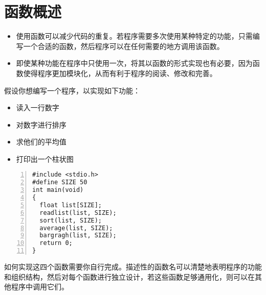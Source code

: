 \section{函数概述}

\begin{frame}
\begin{itemize}
\item 使用函数可以减少代码的重复。若程序需要多次使用某种特定的功能，只需编写一个合适的函数，然后程序可以在任何需要的地方调用该函数。\\[0.2in]
\item 即使某种功能在程序中只使用一次，将其以函数的形式实现也有必要，因为函数使得程序更加模块化，从而有利于程序的阅读、修改和完善。
\end{itemize}
\end{frame}

\begin{frame}
假设你想编写一个程序，以实现如下功能：\vspace{0.1in}

\begin{itemize}
\item  读入一行数字 \\[0.1in]
\item  对数字进行排序 \\[0.1in]
\item  求他们的平均值 \\[0.1in]
\item  打印出一个柱状图
\end{itemize}
\end{frame}

\begin{frame}[fragile]
\begin{lstlisting}[numbers=left]
#include <stdio.h>
#define SIZE 50
int main(void)
{
  float list[SIZE];  
  readlist(list, SIZE);
  sort(list, SIZE);
  average(list, SIZE);
  bargragh(list, SIZE);  
  return 0;
}
\end{lstlisting}
\end{frame}

\begin{frame}[fragile]
如何实现这四个函数需要你自行完成。描述性的函数名可以清楚地表明程序的功能和组织结构，然后对每个函数进行独立设计，若这些函数足够通用化，则可以在其他程序中调用它们。
\end{frame}

